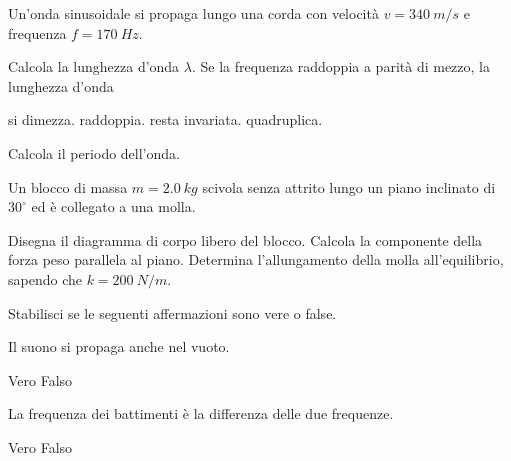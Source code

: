 \documentclass[10pt]{article}
\begin{document}
\testheader[date=22/05/2026,
  title={Onde meccaniche, suono e fenomeni ondulatori: battimenti ed effetto Doppler}]

\exercise Un'onda sinusoidale si propaga lungo una corda con velocità
$v = \qty{340}{m/s}$ e frequenza $f = \qty{170}{Hz}$.

\begin{parts}
  \itemx[pts=1] Calcola la lunghezza d'onda $\lambda$.
  \itemx[pts=1] Se la frequenza raddoppia a parità di mezzo, la lunghezza d'onda
    \begin{choices}
      \correct si dimezza.
      \choice  raddoppia.
      \choice  resta invariata.
      \choice  quadruplica.
    \end{choices}
  \itemx[pts=1, noreduced] Calcola il periodo dell'onda.
\end{parts}

\exercise[diff=2] Un blocco di massa $m = \qty{2.0}{kg}$ scivola senza attrito
lungo un piano inclinato di $30^\circ$ ed è collegato a una molla.

\begin{minipage}[c]{.42\linewidth}
  \centering
\end{minipage}\hfill
\begin{minipage}[c]{.55\linewidth}
  \begin{parts}[ragged]
    \itemx[pts=1] Disegna il diagramma di corpo libero del blocco.
    \itemx[pts=1.5] Calcola la componente della forza peso parallela al piano.
    \itemx[pts=1.5, noreduced] Determina l'allungamento della molla all'equilibrio,
      sapendo che $k = \qty{200}{N/m}$.
  \end{parts}
\end{minipage}

\exercise Stabilisci se le seguenti affermazioni sono vere o false.

\begin{parts}
  \itemx[pts=0.5] Il suono si propaga anche nel vuoto.
    \begin{choices}[shuffle=false] \choice Vero \correct Falso \end{choices}
  \itemx[pts=0.5] La frequenza dei battimenti è la differenza delle due frequenze.
    \begin{choices}[shuffle=false] \correct Vero \choice Falso \end{choices}
\end{parts}
\exercisescore

\vfill
\finalscore[style=table]
\end{document}
